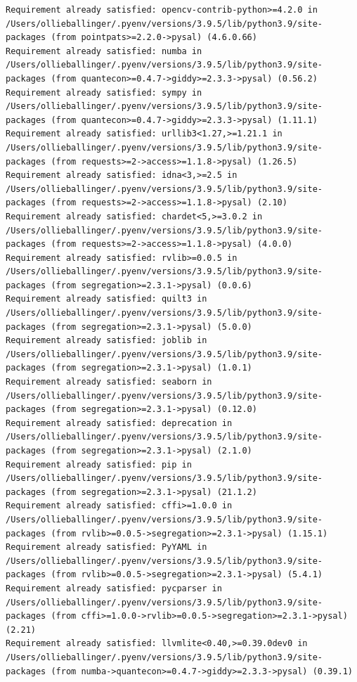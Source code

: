 \documentclass[
  letterpaper,
  DIV=11,
  numbers=noendperiod]{scrreprt}
\begin{document}
\begin{verbatim}
Requirement already satisfied: opencv-contrib-python>=4.2.0 in /Users/ollieballinger/.pyenv/versions/3.9.5/lib/python3.9/site-packages (from pointpats>=2.2.0->pysal) (4.6.0.66)
Requirement already satisfied: numba in /Users/ollieballinger/.pyenv/versions/3.9.5/lib/python3.9/site-packages (from quantecon>=0.4.7->giddy>=2.3.3->pysal) (0.56.2)
Requirement already satisfied: sympy in /Users/ollieballinger/.pyenv/versions/3.9.5/lib/python3.9/site-packages (from quantecon>=0.4.7->giddy>=2.3.3->pysal) (1.11.1)
Requirement already satisfied: urllib3<1.27,>=1.21.1 in /Users/ollieballinger/.pyenv/versions/3.9.5/lib/python3.9/site-packages (from requests>=2->access>=1.1.8->pysal) (1.26.5)
Requirement already satisfied: idna<3,>=2.5 in /Users/ollieballinger/.pyenv/versions/3.9.5/lib/python3.9/site-packages (from requests>=2->access>=1.1.8->pysal) (2.10)
Requirement already satisfied: chardet<5,>=3.0.2 in /Users/ollieballinger/.pyenv/versions/3.9.5/lib/python3.9/site-packages (from requests>=2->access>=1.1.8->pysal) (4.0.0)
Requirement already satisfied: rvlib>=0.0.5 in /Users/ollieballinger/.pyenv/versions/3.9.5/lib/python3.9/site-packages (from segregation>=2.3.1->pysal) (0.0.6)
Requirement already satisfied: quilt3 in /Users/ollieballinger/.pyenv/versions/3.9.5/lib/python3.9/site-packages (from segregation>=2.3.1->pysal) (5.0.0)
Requirement already satisfied: joblib in /Users/ollieballinger/.pyenv/versions/3.9.5/lib/python3.9/site-packages (from segregation>=2.3.1->pysal) (1.0.1)
Requirement already satisfied: seaborn in /Users/ollieballinger/.pyenv/versions/3.9.5/lib/python3.9/site-packages (from segregation>=2.3.1->pysal) (0.12.0)
Requirement already satisfied: deprecation in /Users/ollieballinger/.pyenv/versions/3.9.5/lib/python3.9/site-packages (from segregation>=2.3.1->pysal) (2.1.0)
Requirement already satisfied: pip in /Users/ollieballinger/.pyenv/versions/3.9.5/lib/python3.9/site-packages (from segregation>=2.3.1->pysal) (21.1.2)
Requirement already satisfied: cffi>=1.0.0 in /Users/ollieballinger/.pyenv/versions/3.9.5/lib/python3.9/site-packages (from rvlib>=0.0.5->segregation>=2.3.1->pysal) (1.15.1)
Requirement already satisfied: PyYAML in /Users/ollieballinger/.pyenv/versions/3.9.5/lib/python3.9/site-packages (from rvlib>=0.0.5->segregation>=2.3.1->pysal) (5.4.1)
Requirement already satisfied: pycparser in /Users/ollieballinger/.pyenv/versions/3.9.5/lib/python3.9/site-packages (from cffi>=1.0.0->rvlib>=0.0.5->segregation>=2.3.1->pysal) (2.21)
Requirement already satisfied: llvmlite<0.40,>=0.39.0dev0 in /Users/ollieballinger/.pyenv/versions/3.9.5/lib/python3.9/site-packages (from numba->quantecon>=0.4.7->giddy>=2.3.3->pysal) (0.39.1)

\end{verbatim}
\end{document}
